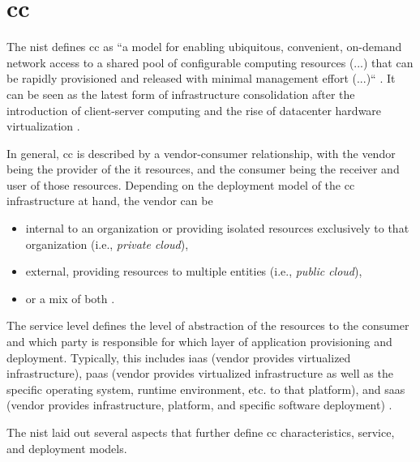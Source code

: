 \section{\acl{cc}} \label{sec:foundations-cloud}

The \ac{nist} defines \ac{cc} as ``a model for enabling ubiquitous, convenient, on-demand network access to a shared pool of configurable computing resources (...) that can be rapidly provisioned and released with minimal management effort (...)`` \cite{mell_nist_2011}. It can be seen as the latest form of infrastructure consolidation after the introduction of client-server computing and the rise of datacenter hardware virtualization \cite[p.\ 1]{sehgal_cloud_2018}.
		
In general, \ac{cc} is described by a vendor-consumer relationship, with the vendor being the provider of the \ac{it} resources, and the consumer being the receiver and user of those resources. Depending on the deployment model of the \ac{cc} infrastructure at hand, the vendor can be 
		
\begin{itemize}
	\item internal to an organization or providing isolated resources exclusively to that organization (i.e., \textit{private cloud}),
	\item external, providing resources to multiple entities (i.e., \textit{public cloud}),
	\item or a mix of both \cite{mell_nist_2011}. 
\end{itemize}  
		
The service level defines the level of abstraction of the resources to the consumer and which party is responsible for which layer of application provisioning and deployment. Typically, this includes \ac{iaas} (vendor provides virtualized infrastructure), \ac{paas} (vendor provides virtualized infrastructure as well as the specific operating system, runtime environment, etc. to that platform), and \ac{saas} (vendor provides infrastructure, platform, and specific software deployment) \cite{mell_nist_2011}. 
		
The \ac{nist} laid out several aspects that further define \ac{cc} characteristics, service, and deployment models.
		
